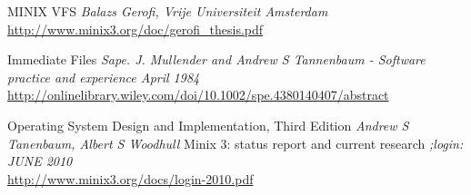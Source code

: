 \cleardoublepage
{}
{}
\begin{thebibliography}{99}

 MINIX VFS {\em Balazs Gerofi, Vrije Universiteit Amsterdam } \\ \url {http://www.minix3.org/doc/gerofi_thesis.pdf}

Immediate Files {\em Sape. J. Mullender and Andrew S Tannenbaum - Software practice and experience April 1984 } \\  \url{http://onlinelibrary.wiley.com/doi/10.1002/spe.4380140407/abstract}


 Operating System Design and Implementation, Third Edition{ \em Andrew S Tanenbaum, Albert S Woodhull }
 Minix 3: status report and current research { \em ;login: JUNE 2010 } \\ \url{http://www.minix3.org/docs/login-2010.pdf}


\end{thebibliography}
